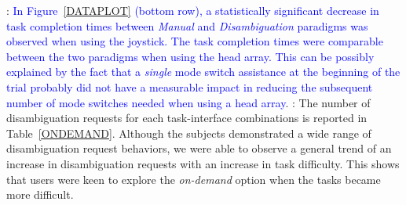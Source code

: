 \documentclass[conference]{IEEEtran}
\begin{document}
\vspace{0.1cm}
: 
\textcolor{blue}{In Figure~\ref{DATAPLOT} (bottom row), a statistically significant decrease in task completion times between \textit{Manual} and \textit{Disambiguation} paradigms was observed when using the joystick. The task completion times were comparable between the two paradigms when using the head array. This can be possibly explained by the fact that a \textit{single} mode switch assistance at the beginning of the trial probably did not have a measurable impact in reducing the subsequent number of mode switches needed when using a head array}. 
\vspace{0.1cm}
: The number of disambiguation requests for each task-interface combinations is reported in Table~\ref{ONDEMAND}. Although the subjects demonstrated a wide range of disambiguation request behaviors, we were able to observe a general trend of an increase in disambiguation requests with an increase in task difficulty. This shows that users were keen to explore the \textit{on-demand} option when the tasks became more difficult. 
\end{document}

